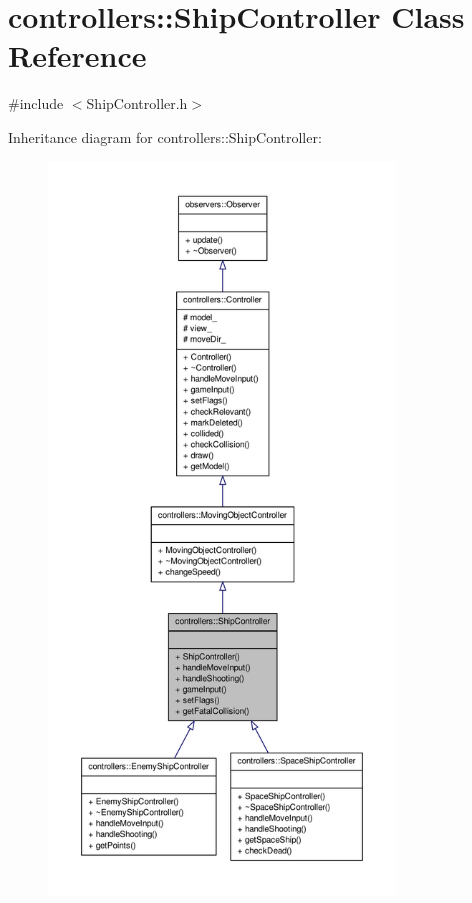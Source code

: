 \hypertarget{classcontrollers_1_1ShipController}{\section{controllers\-:\-:\-Ship\-Controller \-Class \-Reference}
\label{d8/dcc/classcontrollers_1_1ShipController}
}


{\ttfamily \#include $<$\-Ship\-Controller.\-h$>$}



\-Inheritance diagram for controllers\-:\-:\-Ship\-Controller\-:
\nopagebreak
\begin{figure}[H]
\begin{center}
\leavevmode
\includegraphics[height=550pt]{d7/d01/classcontrollers_1_1ShipController__inherit__graph}
\end{center}
\end{figure}


